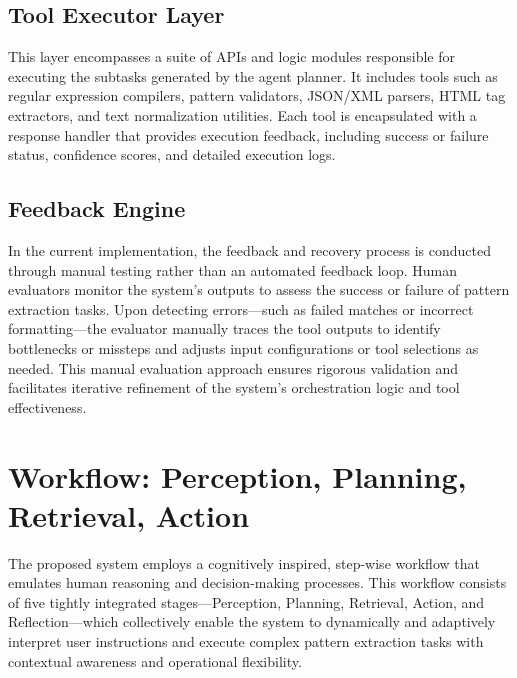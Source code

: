 \subsection{Tool Executor Layer}
This layer encompasses a suite of APIs and logic modules responsible for executing the subtasks generated by the agent planner. It includes tools such as regular expression compilers, pattern validators, JSON/XML parsers, HTML tag extractors, and text normalization utilities. Each tool is encapsulated with a response handler that provides execution feedback, including success or failure status, confidence scores, and detailed execution logs.


\subsection{Feedback Engine}
In the current implementation, the feedback and recovery process is conducted through manual testing rather than an automated feedback loop. Human evaluators monitor the system's outputs to assess the success or failure of pattern extraction tasks. Upon detecting errors—such as failed matches or incorrect formatting—the evaluator manually traces the tool outputs to identify bottlenecks or missteps and adjusts input configurations or tool selections as needed. This manual evaluation approach ensures rigorous validation and facilitates iterative refinement of the system's orchestration logic and tool effectiveness.


\section{Workflow: Perception, Planning, Retrieval, Action}
The proposed system employs a cognitively inspired, step-wise workflow that emulates human reasoning and decision-making processes. This workflow consists of five tightly integrated stages—Perception, Planning, Retrieval, Action, and Reflection—which collectively enable the system to dynamically and adaptively interpret user instructions and execute complex pattern extraction tasks with contextual awareness and operational flexibility.



